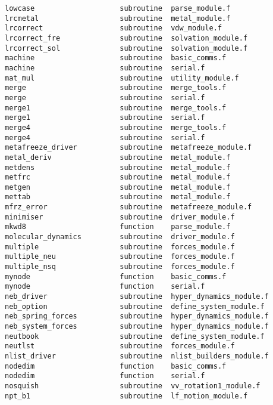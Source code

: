 \begin{verbatim}
lowcase                    subroutine  parse_module.f            
lrcmetal                   subroutine  metal_module.f            
lrcorrect                  subroutine  vdw_module.f              
lrcorrect_fre              subroutine  solvation_module.f        
lrcorrect_sol              subroutine  solvation_module.f        
machine                    subroutine  basic_comms.f             
machine                    subroutine  serial.f                  
mat_mul                    subroutine  utility_module.f          
merge                      subroutine  merge_tools.f             
merge                      subroutine  serial.f                  
merge1                     subroutine  merge_tools.f             
merge1                     subroutine  serial.f                  
merge4                     subroutine  merge_tools.f             
merge4                     subroutine  serial.f                
metafreeze_driver          subroutine  metafreeze_module.f       
metal_deriv                subroutine  metal_module.f            
metdens                    subroutine  metal_module.f            
metfrc                     subroutine  metal_module.f            
metgen                     subroutine  metal_module.f            
mettab                     subroutine  metal_module.f            
mfrz_error                 subroutine  metafreeze_module.f       
minimiser                  subroutine  driver_module.f           
mkwd8                      function    parse_module.f            
molecular_dynamics         subroutine  driver_module.f           
multiple                   subroutine  forces_module.f           
multiple_neu               subroutine  forces_module.f           
multiple_nsq               subroutine  forces_module.f           
mynode                     function    basic_comms.f             
mynode                     function    serial.f                  
neb_driver                 subroutine  hyper_dynamics_module.f   
neb_option                 subroutine  define_system_module.f    
neb_spring_forces          subroutine  hyper_dynamics_module.f   
neb_system_forces          subroutine  hyper_dynamics_module.f   
neutbook                   subroutine  define_system_module.f    
neutlst                    subroutine  forces_module.f           
nlist_driver               subroutine  nlist_builders_module.f   
nodedim                    function    basic_comms.f             
nodedim                    function    serial.f                  
nosquish                   subroutine  vv_rotation1_module.f     
npt_b1                     subroutine  lf_motion_module.f        

\end{verbatim}
